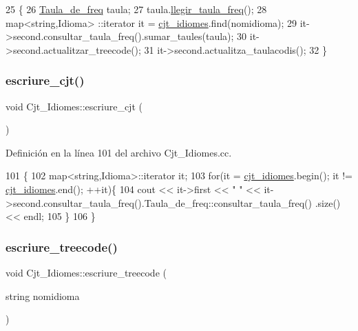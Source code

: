 \begin{DoxyCode}
25                                                    \{
26     \hyperlink{class_taula__de__freq}{Taula\_de\_freq} taula;
27     taula.\hyperlink{class_taula__de__freq_a6e3d7bfaa7227f9b7603864c7a3da2cf}{llegir\_taula\_freq}();
28     map<string,Idioma> ::iterator it = \hyperlink{class_cjt___idiomes_a1d294e628332477cbb3334cd8fb490a4}{cjt\_idiomes}.find(nomidioma);
29     it->second.consultar\_taula\_freq().sumar\_taules(taula);
30     it->second.actualitzar\_treecode();
31     it->second.actualitza\_taulacodis();
32 \}
\end{DoxyCode}
\mbox{\label{class_cjt___idiomes_abdfd8226b0c00d4a3f5bab91b44a170f}} 
\subsubsection{\texorpdfstring{escriure\+\_\+cjt()}{escriure\_cjt()}}
{\footnotesize\ttfamily void Cjt\+\_\+\+Idiomes\+::escriure\+\_\+cjt (\begin{DoxyParamCaption}{ }\end{DoxyParamCaption})}



Definición en la línea 101 del archivo Cjt\+\_\+\+Idiomes.\+cc.


\begin{DoxyCode}
101                               \{
102     map<string,Idioma>::iterator it;
103     \textcolor{keywordflow}{for}(it = \hyperlink{class_cjt___idiomes_a1d294e628332477cbb3334cd8fb490a4}{cjt\_idiomes}.begin(); it != \hyperlink{class_cjt___idiomes_a1d294e628332477cbb3334cd8fb490a4}{cjt\_idiomes}.end(); ++it)\{
104         cout << it->first << \textcolor{stringliteral}{" "} << it->second.consultar\_taula\_freq().Taula\_de\_freq::consultar\_taula\_freq()
      .size() << endl;
105     \}
106 \}
\end{DoxyCode}
\mbox{\label{class_cjt___idiomes_a49666adf7e2a9cefc96d4b7b3d925710}} 
\subsubsection{\texorpdfstring{escriure\+\_\+treecode()}{escriure\_treecode()}}
{\footnotesize\ttfamily void Cjt\+\_\+\+Idiomes\+::escriure\+\_\+treecode (\begin{DoxyParamCaption}\item[{string}]{nomidioma }\end{DoxyParamCaption})}



